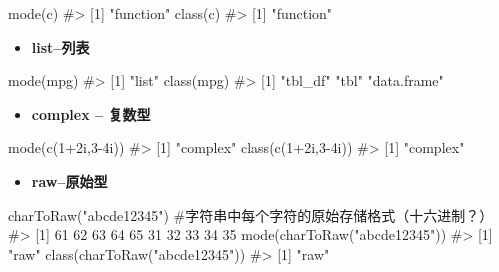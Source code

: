 \documentclass[
  letterpaper,
  DIV=11,
  numbers=noendperiod]{scrreprt}
\newenvironment{Shaded}{\begin{snugshade}}{\end{snugshade}}
\newcommand{\CommentTok}[1]{\textcolor[rgb]{0.37,0.37,0.37}{#1}}
\newcommand{\DecValTok}[1]{\textcolor[rgb]{0.68,0.00,0.00}{#1}}
\newcommand{\FunctionTok}[1]{\textcolor[rgb]{0.28,0.35,0.67}{#1}}
\newcommand{\NormalTok}[1]{\textcolor[rgb]{0.00,0.23,0.31}{#1}}
\newcommand{\SpecialCharTok}[1]{\textcolor[rgb]{0.37,0.37,0.37}{#1}}
\newcommand{\StringTok}[1]{\textcolor[rgb]{0.13,0.47,0.30}{#1}}
\providecommand{\tightlist}{%
  \setlength{\itemsep}{0pt}\setlength{\parskip}{0pt}}\usepackage{longtable,booktabs,array}
\begin{document}
\begin{Shaded}
\begin{Highlighting}[]
\FunctionTok{mode}\NormalTok{(c)}
\CommentTok{\#\textgreater{} [1] "function"}
\FunctionTok{class}\NormalTok{(c)}
\CommentTok{\#\textgreater{} [1] "function"}
\end{Highlighting}
\end{Shaded}

\begin{itemize}
\tightlist
\item
  \textbf{list--列表}
\end{itemize}

\begin{Shaded}
\begin{Highlighting}[]
\FunctionTok{mode}\NormalTok{(mpg)}
\CommentTok{\#\textgreater{} [1] "list"}
\FunctionTok{class}\NormalTok{(mpg)}
\CommentTok{\#\textgreater{} [1] "tbl\_df"     "tbl"        "data.frame"}
\end{Highlighting}
\end{Shaded}

\begin{itemize}
\tightlist
\item
  \textbf{complex -- 复数型}
\end{itemize}

\begin{Shaded}
\begin{Highlighting}[]

\FunctionTok{mode}\NormalTok{(}\FunctionTok{c}\NormalTok{(}\DecValTok{1}\SpecialCharTok{+}\NormalTok{2i,}\DecValTok{3}\SpecialCharTok{{-}}\NormalTok{4i)) }
\CommentTok{\#\textgreater{} [1] "complex"}
\FunctionTok{class}\NormalTok{(}\FunctionTok{c}\NormalTok{(}\DecValTok{1}\SpecialCharTok{+}\NormalTok{2i,}\DecValTok{3}\SpecialCharTok{{-}}\NormalTok{4i))}
\CommentTok{\#\textgreater{} [1] "complex"}
\end{Highlighting}
\end{Shaded}

\begin{itemize}
\tightlist
\item
  \textbf{raw--原始型}
\end{itemize}

\begin{Shaded}
\begin{Highlighting}[]
\FunctionTok{charToRaw}\NormalTok{(}\StringTok{"abcde12345"}\NormalTok{) }\CommentTok{\#字符串中每个字符的原始存储格式（十六进制？）}
\CommentTok{\#\textgreater{}  [1] 61 62 63 64 65 31 32 33 34 35}
\FunctionTok{mode}\NormalTok{(}\FunctionTok{charToRaw}\NormalTok{(}\StringTok{"abcde12345"}\NormalTok{)) }
\CommentTok{\#\textgreater{} [1] "raw"}
\FunctionTok{class}\NormalTok{(}\FunctionTok{charToRaw}\NormalTok{(}\StringTok{"abcde12345"}\NormalTok{))}
\CommentTok{\#\textgreater{} [1] "raw"}
\end{Highlighting}
\end{Shaded}
\end{document}
